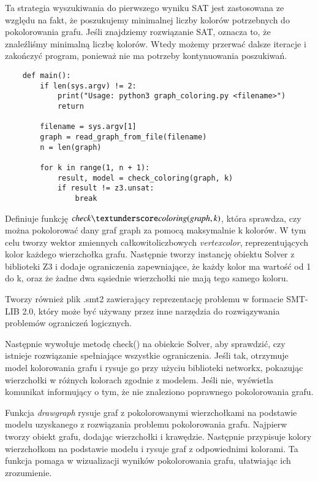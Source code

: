 Ta strategia wyszukiwania do pierwszego wyniku SAT jest zastosowana ze względu na fakt, że poszukujemy minimalnej liczby kolorów potrzebnych do pokolorowania grafu. Jeśli znajdziemy rozwiązanie SAT, oznacza to, że znaleźliśmy minimalną liczbę kolorów. Wtedy możemy przerwać dalsze iteracje i zakończyć program, ponieważ nie ma potrzeby kontynuowania poszukiwań.

\begin{lstlisting}
	def main():
		if len(sys.argv) != 2:
			print("Usage: python3 graph_coloring.py <filename>")
			return
		
		filename = sys.argv[1]
		graph = read_graph_from_file(filename)
		n = len(graph)
		
		for k in range(1, n + 1):
			result, model = check_coloring(graph, k)
			if result != z3.unsat:
				break
\end{lstlisting}

Definiuje funkcję $\checkcoloring$, która sprawdza, czy można pokolorować dany graf graph za pomocą maksymalnie k kolorów. W tym celu tworzy wektor zmiennych całkowitoliczbowych \textit{vertex\textunderscore color}, reprezentujących kolor każdego wierzchołka grafu. Następnie tworzy instancję obiektu Solver z biblioteki Z3 i dodaje ograniczenia zapewniające, że każdy kolor ma wartość od 1 do k, oraz że żadne dwa sąsiednie wierzchołki nie mają tego samego koloru.

Tworzy również plik .smt2 zawierający reprezentację problemu w formacie SMT-LIB 2.0, który może być używany przez inne narzędzia do rozwiązywania problemów ograniczeń logicznych.

Następnie wywołuje metodę check() na obiekcie Solver, aby sprawdzić, czy istnieje rozwiązanie spełniające wszystkie ograniczenia. Jeśli tak, otrzymuje model kolorowania grafu i rysuje go przy użyciu biblioteki networkx, pokazując wierzchołki w różnych kolorach zgodnie z modelem. Jeśli nie, wyświetla komunikat informujący o tym, że nie znaleziono poprawnego pokolorowania grafu.



Funkcja \textit{draw\textunderscore graph} rysuje graf z pokolorowanymi wierzchołkami na podstawie modelu uzyskanego z rozwiązania problemu pokolorowania grafu. Najpierw tworzy obiekt grafu, dodając wierzchołki i krawędzie. Następnie przypisuje kolory wierzchołkom na podstawie modelu i rysuje graf z odpowiednimi kolorami. Ta funkcja pomaga w wizualizacji wyników pokolorowania grafu, ułatwiając ich zrozumienie.


